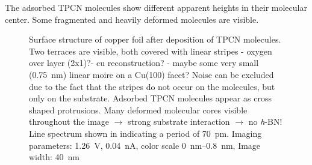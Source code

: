 The adsorbed TPCN molecules show different apparent heights in their molecular center. Some fragmented and heavily deformed molecules are visible.

\begin{figure}
 \centering
  \quad
 \caption{Surface structure of copper foil after deposition of TPCN molecules. Two terraces are visible, both covered with linear stripes - oxygen over layer (2x1)?- cu reconstruction? - maybe some very small (\SI{0.75}{\nm}) linear moire on a Cu(100) facet? Noise can be excluded due to the fact that the stripes do not occur on the molecules, but only on the substrate. Adsorbed TPCN molecules appear as cross shaped protrusions. Many deformed molecular cores visible throughout the image $\rightarrow$ strong substrate interaction $\rightarrow$ no \textit{h}-BN! Line spectrum shown in  indicating a period of \SI{70}{\pico \meter}. Imaging parameters: 		
 	\SI{1.26}{\volt}, \SI{0.04}{\nano\ampere}, 
 	color scale \SIrange{0}{0.8}{\nano \meter}, 
 	Image width: \SI{40}{\nano \meter} }
\label{fig:tpcn-on-cu-foil}
\end{figure}
